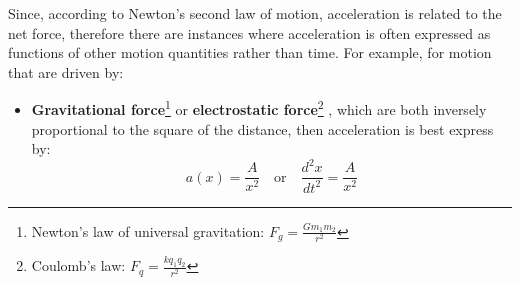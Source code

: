 \documentclass{../../oss-handout}
\begin{document}
Since, according to Newton's second law of motion, acceleration is related to
the net force, therefore there are instances where acceleration is often
expressed as functions of other motion quantities rather than time. For example,
for motion that are driven by:
\begin{itemize}[leftmargin=15pt]
\item\textbf{Gravitational force}\footnote{Newton's law of universal
  gravitation: $\displaystyle F_g=\frac{Gm_1m_2}{r^2}$} or
  \textbf{electrostatic force}\footnote{Coulomb's law:
    $\displaystyle F_q=\frac{kq_1q_2}{r^2}$} , which are both inversely
  proportional to the square of the distance, then acceleration is best express
  by:
  \begin{equation*}
    a(x)=\frac{A}{x^2} \quad\text{or}\quad \frac{d^2x}{dt^2}=\frac{A}{x^2}
  \end{equation*}
  

\end{itemize}
\end{document}
